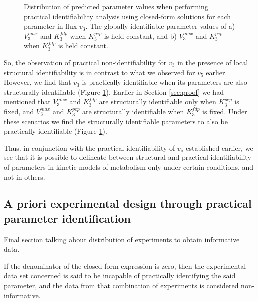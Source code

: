 \documentclass[10pt]{article}
\begin{document}
	\begin{figure}[!tbhp]
		\caption{Distribution of predicted parameter values when performing practical identifiability analysis using closed-form solutions for each parameter in flux $v_3$. The globally identifiable parameter values of a)  $V_3^{max}$ and $K_3^{fdp}$ when $K_3^{pep}$ is held constant, and b) $V_3^{max}$ and $K_3^{pep}$ when $K_3^{fdp}$ is held constant.}\label{fig:v3_var_ck_values}
	\end{figure}	

	So, the observation of practical non-identifiability for $v_3$ in the presence of local structural identifiability is in contrast to what we observed for $v_5$ earlier. However, we find that $v_3$ is practically identifiable when its parameters are also structurally identifiable (Figure \ref{fig:v3_var_ck_values}). Earlier in Section \ref{sec:proof} we had mentioned that $V_3^{max}$ and $K_3^{fdp}$ are structurally identifiable only when $K_3^{pep}$ is fixed, and $V_3^{max}$ and $K_3^{pep}$ are structurally identifiable when $K_3^{fdp}$ is fixed. Under these scenarios we find the structurally identifiable parameters to also be practically identifiable (Figure \ref{fig:v3_var_ck_values}).	
	
	Thus, in conjunction with the practical identifiability of $v_5$ established earlier, we see that it is possible to delineate between structural and practical identifiability of parameters in kinetic models of metabolism only under certain conditions, and not in others.
	
	\subsection{A priori experimental design through practical parameter identification}\label{sec:design}	
	Final section talking about distribution of experiments to obtain informative data.
	
	If the denominator of the closed-form expression is zero, then the experimental data set concerned is said to be incapable of practically identifying the said parameter, and the data from that combination of experiments is considered non-informative.
	
\end{document}

